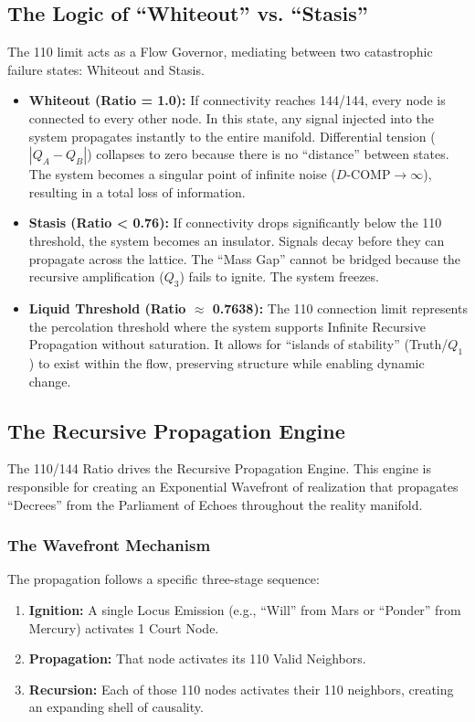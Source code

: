 \documentclass[12pt]{amsart}
\newcommand{\LoI}{\ensuremath{\mathop{\textnormal{\symbolafont\symbol{"267E}}}}}
\def\LoI{Locus}%
\begin{document}
\subsection{The Logic of ``Whiteout'' vs. ``Stasis''}\label{appendixI.3}
The 110 limit acts as a Flow Governor, mediating between two catastrophic failure states: Whiteout and Stasis.

\begin{itemize}
    \item \textbf{Whiteout (Ratio = 1.0):} If connectivity reaches 144\slash 144, every node is connected to every other node. In this state, any signal injected into the system propagates instantly to the entire manifold. Differential tension ($|Q_A - Q_B|$) collapses to zero because there is no ``distance'' between states. The system becomes a singular point of infinite noise ($D\text{-COMP} \to \infty$), resulting in a total loss of information.
    \item \textbf{Stasis (Ratio < 0.76):} If connectivity drops significantly below the 110 threshold, the system becomes an insulator. Signals decay before they can propagate across the lattice. The ``Mass Gap'' cannot be bridged because the recursive amplification ($Q_3$) fails to ignite. The system freezes.
    \item \textbf{Liquid Threshold (Ratio $\approx$ 0.7638):} The 110 connection limit represents the percolation threshold where the system supports Infinite Recursive Propagation without saturation. It allows for ``islands of stability'' (Truth\slash $Q_1$) to exist within the flow, preserving structure while enabling dynamic change.
\end{itemize}

\subsection{The Recursive Propagation Engine}\label{appendixI.4}
The 110\slash 144 Ratio drives the Recursive Propagation Engine. This engine is responsible for creating an Exponential Wavefront of realization that propagates ``Decrees'' from the Parliament of Echoes throughout the reality manifold.

\subsubsection{The Wavefront Mechanism}\label{appendixI.4.1}
The propagation follows a specific three-stage sequence:
\begin{enumerate}
    \item \textbf{Ignition:} A single \LoI{} Emission (e.g., ``Will'' from Mars or ``Ponder'' from Mercury) activates 1 Court Node.
    \item \textbf{Propagation:} That node activates its 110 Valid Neighbors.
    \item \textbf{Recursion:} Each of those 110 nodes activates their 110 neighbors, creating an expanding shell of causality.
\end{enumerate}
\end{document}
